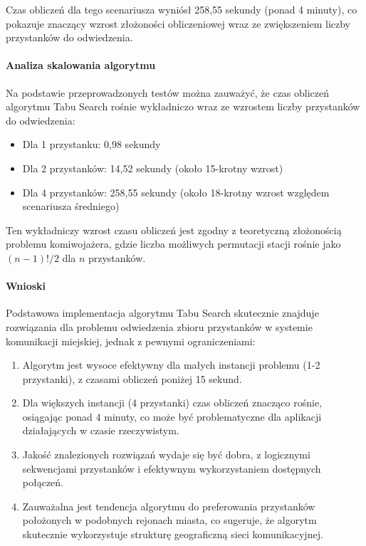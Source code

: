 \documentclass[12pt,a4paper]{article}
\begin{document}
Czas obliczeń dla tego scenariusza wyniósł 258,55 sekundy (ponad 4 minuty), co pokazuje znaczący wzrost złożoności obliczeniowej wraz ze zwiększeniem liczby przystanków do odwiedzenia.

\paragraph{Analiza skalowania algorytmu}
Na podstawie przeprowadzonych testów można zauważyć, że czas obliczeń algorytmu Tabu Search rośnie wykładniczo wraz ze wzrostem liczby przystanków do odwiedzenia:

\begin{itemize}
    \item Dla 1 przystanku: 0,98 sekundy
    \item Dla 2 przystanków: 14,52 sekundy (około 15-krotny wzrost)
    \item Dla 4 przystanków: 258,55 sekundy (około 18-krotny wzrost względem scenariusza średniego)
\end{itemize}

Ten wykładniczy wzrost czasu obliczeń jest zgodny z teoretyczną złożonością problemu komiwojażera, gdzie liczba możliwych permutacji stacji rośnie jako $(n-1)!/2$ dla $n$ przystanków.

\paragraph{Wnioski}
Podstawowa implementacja algorytmu Tabu Search skutecznie znajduje rozwiązania dla problemu odwiedzenia zbioru przystanków w systemie komunikacji miejskiej, jednak z pewnymi ograniczeniami:

\begin{enumerate}
    \item Algorytm jest wysoce efektywny dla małych instancji problemu (1-2 przystanki), z czasami obliczeń poniżej 15 sekund.
    \item Dla większych instancji (4 przystanki) czas obliczeń znacząco rośnie, osiągając ponad 4 minuty, co może być problematyczne dla aplikacji działających w czasie rzeczywistym.
    \item Jakość znalezionych rozwiązań wydaje się być dobra, z logicznymi sekwencjami przystanków i efektywnym wykorzystaniem dostępnych połączeń.
    \item Zauważalna jest tendencja algorytmu do preferowania przystanków położonych w podobnych rejonach miasta, co sugeruje, że algorytm skutecznie wykorzystuje strukturę geograficzną sieci komunikacyjnej.
\end{enumerate}
\end{document}
